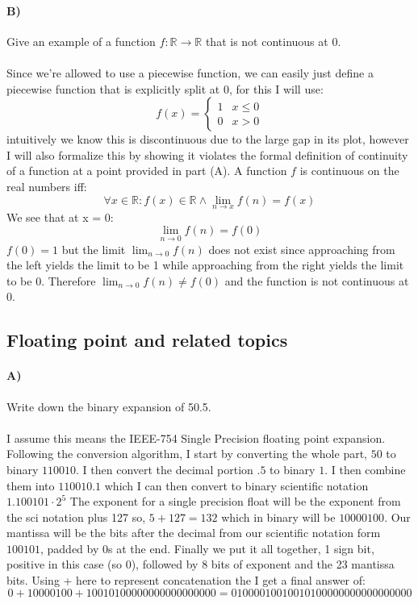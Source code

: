\documentclass{article}
\begin{document}
\paragraph{B)}
Give an example of a function $f:\mathbb{R}\to\mathbb{R}$ that is not continuous at 0.
\paragraph{}
Since we're allowed to use a piecewise function, we can easily just define a piecewise function that is explicitly split at 0, for this I will use:
\[f(x) = \begin{cases} 1 & x\leq0 \\0 & x>0 \end{cases}\]
intuitively we know this is discontinuous due to the large gap in its plot, however I will also formalize this by showing it violates the formal definition of continuity of a function at a point provided in part (A). A function $f$ is continuous on the real numbers iff:
\[\forall x\in\mathbb{R}:f(x)\in\mathbb{R}\wedge\lim_{n\to x}f(n) = f(x)\]
We see that at x = 0:
\[\lim_{n\to 0}f(n) = f(0)\]
$f(0) = 1$ but the limit $\lim_{n\to 0}f(n)$ does not exist since approaching from the left yields the limit to be 1 while approaching from the right yields the limit to be 0. Therefore $\lim_{n\to 0}f(n) \neq f(0)$ and the function is not continuous at 0.

\subsection{Floating point and related topics}
\paragraph{A)}
Write down the binary expansion of 50.5.
\paragraph{}
I assume this means the IEEE-754 Single Precision floating point expansion. 
\newline
Following the conversion algorithm, I start by converting the whole part, $50$ to binary $110010$. I then convert the decimal portion $.5$ to binary $1$. I then combine them into $110010.1$ which I can then convert to binary scientific notation $1.100101 \cdot 2^5$ The exponent for a single precision float will be the exponent from the sci notation plus 127 so, $5 + 127 = 132$ which in binary will be $10000100$. Our mantissa will be the bits after the decimal from our scientific notation form $100101$, padded by 0s at the end. Finally we put it all together, 1 sign bit, positive in this case (so 0), followed by 8 bits of exponent and the 23 mantissa bits. Using + here to represent concatenation the I get a final answer of:
\[0 + 10000100 + 10010100000000000000000 = 01000010010010100000000000000000\]
\end{document}
